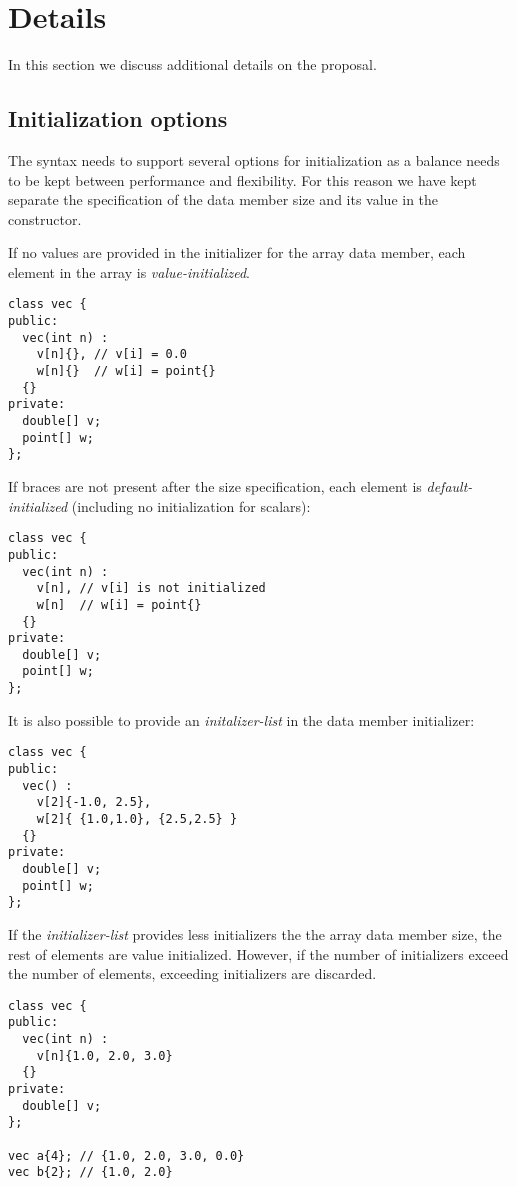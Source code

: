 \section{Details}

In this section we discuss additional details on the proposal.

\subsection{Initialization options}

The syntax needs to support several options for initialization as a balance
needs to be kept between performance and flexibility. For this reason we have
kept separate the specification of the data member size and its value in the
constructor.

If no values are provided in the initializer for the array data member, each
element in the array is \emph{value-initialized}.

\begin{lstlisting}
class vec {
public:
  vec(int n) : 
    v[n]{}, // v[i] = 0.0
    w[n]{}  // w[i] = point{}
  {}
private:
  double[] v;
  point[] w;
};
\end{lstlisting}

If braces are not present after the size specification, each element is
\emph{default-initialized} (including no initialization for scalars):


\begin{lstlisting}
class vec {
public:
  vec(int n) : 
    v[n], // v[i] is not initialized
    w[n]  // w[i] = point{}
  {}
private:
  double[] v;
  point[] w;
};
\end{lstlisting}

It is also possible to provide an \emph{initalizer-list} in the data member initializer:

\begin{lstlisting}
class vec {
public:
  vec() : 
    v[2]{-1.0, 2.5}, 
    w[2]{ {1.0,1.0}, {2.5,2.5} }
  {}
private:
  double[] v;
  point[] w;
};
\end{lstlisting}

If the \emph{initializer-list} provides less initializers the the array data member
size, the rest of elements are value initialized. However, if the number of
initializers exceed the number of elements, exceeding initializers are
discarded.

\begin{lstlisting}
class vec {
public:
  vec(int n) :
    v[n]{1.0, 2.0, 3.0}
  {}
private:
  double[] v;
};

vec a{4}; // {1.0, 2.0, 3.0, 0.0}
vec b{2}; // {1.0, 2.0}
\end{lstlisting}


